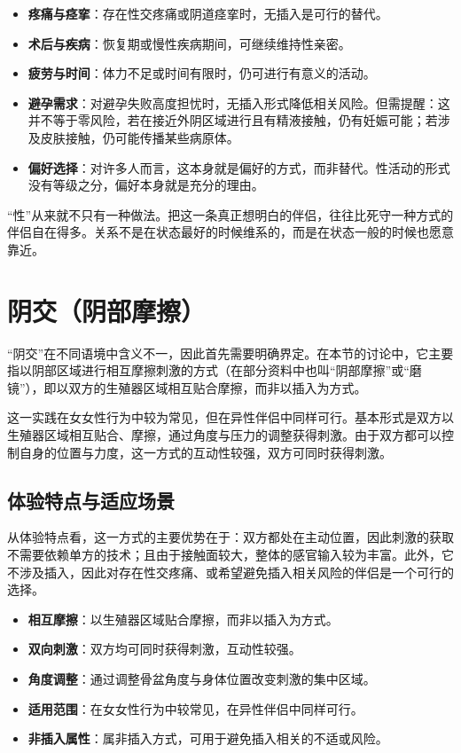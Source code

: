 \documentclass[12pt,UTF8]{ctexbook}
\begin{document}
\begin{itemize}
\item \textbf{疼痛与痉挛}：存在性交疼痛或阴道痉挛时，无插入是可行的替代。
\item \textbf{术后与疾病}：恢复期或慢性疾病期间，可继续维持性亲密。
\item \textbf{疲劳与时间}：体力不足或时间有限时，仍可进行有意义的活动。
\item \textbf{避孕需求}：对避孕失败高度担忧时，无插入形式降低相关风险。但需提醒：这并不等于零风险，若在接近外阴区域进行且有精液接触，仍有妊娠可能；若涉及皮肤接触，仍可能传播某些病原体。
\item \textbf{偏好选择}：对许多人而言，这本身就是偏好的方式，而非替代。性活动的形式没有等级之分，偏好本身就是充分的理由。
\end{itemize}

\begin{tcolorbox}[colback=pink!5!white,colframe=red!50!black,title=贴心小叮咛]
“性”从来就不只有一种做法。把这一条真正想明白的伴侣，往往比死守一种方式的伴侣自在得多。关系不是在状态最好的时候维系的，而是在状态一般的时候也愿意靠近。
\end{tcolorbox}

\section{阴交（阴部摩擦）}

“阴交”在不同语境中含义不一，因此首先需要明确界定。在本节的讨论中，它主要指以阴部区域进行相互摩擦刺激的方式（在部分资料中也叫“阴部摩擦”或“磨镜”），即以双方的生殖器区域相互贴合摩擦，而非以插入为方式。

这一实践在女女性行为中较为常见，但在异性伴侣中同样可行。基本形式是双方以生殖器区域相互贴合、摩擦，通过角度与压力的调整获得刺激。由于双方都可以控制自身的位置与力度，这一方式的互动性较强，双方可同时获得刺激。

\subsection{体验特点与适应场景}

从体验特点看，这一方式的主要优势在于：双方都处在主动位置，因此刺激的获取不需要依赖单方的技术；且由于接触面较大，整体的感官输入较为丰富。此外，它不涉及插入，因此对存在性交疼痛、或希望避免插入相关风险的伴侣是一个可行的选择。

\begin{itemize}
\item \textbf{相互摩擦}：以生殖器区域贴合摩擦，而非以插入为方式。
\item \textbf{双向刺激}：双方均可同时获得刺激，互动性较强。
\item \textbf{角度调整}：通过调整骨盆角度与身体位置改变刺激的集中区域。
\item \textbf{适用范围}：在女女性行为中较常见，在异性伴侣中同样可行。
\item \textbf{非插入属性}：属非插入方式，可用于避免插入相关的不适或风险。
\end{itemize}
\end{document}
